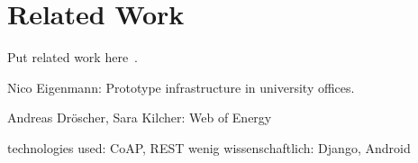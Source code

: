
\chapter{Related Work}
\label{sec:relatedwork}

Put related work here~\cite{mattern2010ict}.

Nico Eigenmann: Prototype infrastructure in university offices\cite{eigenmann2012opportunisticSensing}.

Andreas Dröscher, Sara Kilcher: Web of Energy\cite{droescherKilcher2012webofenergy}


technologies used:
CoAP, REST
wenig wissenschaftlich: Django, Android